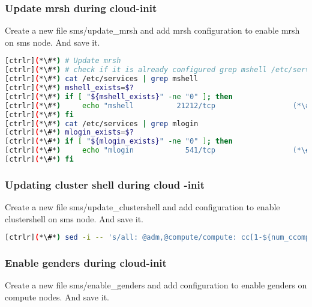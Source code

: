 \subsubsection{Update mrsh during cloud-init}
 
Create a new file sms/update\_mrsh and add mrsh configuration to enable mrsh on sms node. And save it. 


\begin{lstlisting}[language=bash,keywords={}]
[ctrlr](*\#*) # Update mrsh
[ctrlr](*\#*) # check if it is already configured grep mshell /etc/services will return non-zero, else configure"
[ctrlr](*\#*) cat /etc/services | grep mshell
[ctrlr](*\#*) mshell_exists=$?
[ctrlr](*\#*) if [ "${mshell_exists}" -ne "0" ]; then
[ctrlr](*\#*)     echo "mshell          21212/tcp                  (*\#*) mrshd" >> /etc/services
[ctrlr](*\#*) fi
[ctrlr](*\#*) cat /etc/services | grep mlogin
[ctrlr](*\#*) mlogin_exists=$?
[ctrlr](*\#*) if [ "${mlogin_exists}" -ne "0" ]; then
[ctrlr](*\#*)     echo "mlogin            541/tcp                  (*\#*) mrlogind" >> /etc/services
[ctrlr](*\#*) fi
\end{lstlisting} 


\subsubsection{Updating cluster shell during cloud -init}
Create a new file sms/update\_clustershell and add configuration to enable clustershell on sms node. And save it. 


\begin{lstlisting}[language=bash,keywords={}]
[ctrlr](*\#*) sed -i -- 's/all: @adm,@compute/compute: cc[1-${num_ccomputes}]\n&/' /etc/clustershell/groups.d/local.cfg
\end{lstlisting} 
 
 \subsubsection{Enable genders during cloud-init}
 Create a new file sms/enable\_genders and add configuration to enable genders on compute nodes. And save it. 

